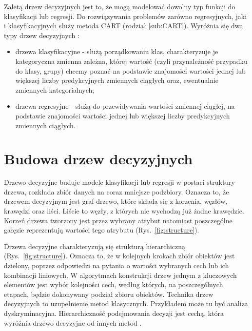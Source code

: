 \documentclass[10pt,a4paper]{article}
\begin{document}
Zaletą drzew decyzyjnych jest to, że mogą modelować dowolny typ funkcji do klasyfikacji lub regresji. Do rozwiązywania problemów zarówno regresyjnych, jaki i klasyfikacyjnych służy metoda CART (rodział \ref{sub:CART}). Wyróżnia się dwa typy drzew decyzyjnych \cite{Breiman1984}:

\begin{itemize}
	\item drzewa klasyfikacyjne - służą porządkowaniu klas, charakteryzuje je kategoryczna zmienna zależna, której wartość (czyli przynależność przypadku do klasy, grupy) chcemy poznać na podstawie znajomości wartości jednej lub większej liczby predykcyjnych zmiennych ciągłych oraz, ewentualnie zmiennych kategorialnych;
	\item drzewa regresyjne - służą do przewidywania wartości zmiennej ciągłej, na podstawie znajomości wartości jednej lub większej liczby predykcyjnych zmiennych ciągłych.
\end{itemize}

\section{Budowa drzew decyzyjnych}
Drzewo decyzyjne buduje modele klasyfikacji lub regresji w postaci struktury drzewa, rozkłada zbiór danych na coraz mniejsze podzbiory. Oznacza to, że drzewem decyzyjnym jest graf-drzewo, które składa się z korzenia, węzłów, krawędzi oraz liści. Liście to węzły, z których nie wychodzą już żadne krawędzie. Korzeń drzewa tworzony jest przez wybrany atrybut natomiast poszczególne gałęzie reprezentują wartości tego atrybutu (Rys.~\ref{fig:structure}). \par
\vskip 0.2in
Drzewa decyzyjne charakteryzują się strukturą hierarchiczną (Rys.~\ref{fig:structure}). Oznacza to, że w kolejnych krokach zbiór obiektów jest dzielony, poprzez odpowiedzi na pytania o wartości wybranych cech lub ich kombinacji liniowych. W algorytmach konstrukcji drzew jednym z kluczowych elementów jest wybór kolejności cech, według których, na poszczególnych etapach, będzie dokonywany podział zbioru obiektów. Technika drzew decyzyjnych to uzupełnienie metod klasycznych. Przykładem może tu być analiza dyskryminacyjna. Hierarchiczność podejmowania decyzji jest cechą, która wyróżnia drzewo decyzyjne od innych metod \cite{Gatnar1998, AnalyticsWWW}.
\end{document}
